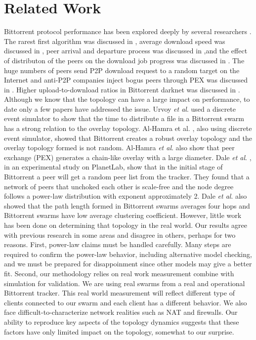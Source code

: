 \documentclass[10pt,conference,letterpaper]{IEEEtran}
\begin{document}
\section{Related Work}\label{relatedworks}
Bittorrent protocol performance has been explored deeply by several researchers \cite{guo2005measurements}\cite{legout2006rarest}\cite{pouwelse2004measurement}\cite{tian2007modeling}.  
The rarest first algorithm was discussed in \cite{legout2006rarest}, average download speed was discussed in \cite{pouwelse2004measurement}, peer arrival and departure process was discussed in \cite{guo2005measurements},and the effect of distributon of the peers on the download job progress was discussed in \cite{tian2007modeling}.
The huge numbers of peers send P2P download request to a random target on the Internet and anti-P2P companies inject bogus peers through PEX was discussed in \cite{li2010measurement}.
Higher upload-to-download ratios in  Bittorrent darknet was discussed in \cite{zhang2010bittorrent}.
Although we know that the topology can have a large impact on performance, to date only a few papers have addressed the issue.
Urvoy \textit{et al}. \cite{urvoy2007impact} used a discrete event simulator to show that the time to distribute a file in a Bittorrent swarm has a strong relation to the overlay topology.  
Al-Hamra et al. \cite{al2007understanding}, also using discrete event simulator, showed that Bittorrent creates a robust overlay topology and the overlay topology formed is not random. 
Al-Hamra \textit{et al}. \cite{al2007understanding} also show that peer exchange (PEX) generates a chain-like overlay with a large diameter. 
Dale \textit{et al}. \cite{dale2008evolution}, in an experimental study on PlanetLab, show that in the initial stage of Bittorrent a peer will get a random peer list from the tracker. 
They found that a network of peers that unchoked each other is scale-free and the node degree follows a power-law distribution with exponent approximately 2. 
Dale \textit{et al}. \cite{dale2008evolution} also showed that the path length formed in Bittorrent swarms averages four hops and Bittorrent swarms have low average clustering coefficient.  
However, little work has been done on determining that topology in the real world. 
Our results agree with previous research \cite{dale2008evolution} in some areas and disagree in others, perhaps for two reasons.
First, power-law claims must be handled carefully. 
Many steps are required to confirm the power-law behavior, including alternative model checking, and we must be prepared for disappoinment since other models may give a better fit. 
Second, our methodology relies on real work measurement combine with simulation for validation. 
We are using real swarms from a real and operational Bittorrent tracker. 
This real world measurement will reflect different type of clients connected to our swarm and each client has a different behavior. 
We also face difficult-to-characterize network realities such as NAT and firewalls. 
Our ability to reproduce key aspects of the topology dynamics suggests that these factors have only limited impact on the topology, somewhat to our surprise. 
\end{document}
